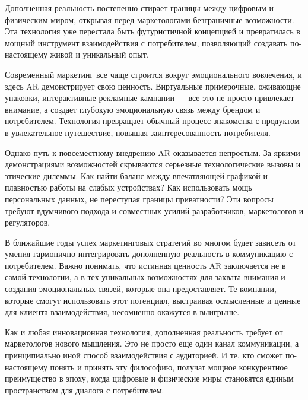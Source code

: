 \documentclass[referat]{SCWorks}
\begin{document}
\conclusion


Дополненная реальность постепенно стирает границы между цифровым и физическим миром, открывая перед маркетологами безграничные возможности. Эта технология уже перестала быть футуристичной концепцией и превратилась в мощный инструмент взаимодействия с потребителем, позволяющий создавать по-настоящему живой и уникальный опыт.

Современный маркетинг все чаще строится вокруг эмоционального вовлечения, и здесь AR демонстрирует свою ценность. Виртуальные примерочные, оживающие упаковки, интерактивные рекламные кампании --- все это не просто привлекает внимание, а создает глубокую эмоциональную связь между брендом и потребителем. Технология превращает обычный процесс знакомства с продуктом в увлекательное путешествие, повышая заинтересованность потребителя.

Однако путь к повсеместному внедрению AR оказывается непростым. За яркими демонстрациями возможностей скрываются серьезные технологические вызовы и этические дилеммы. Как найти баланс между впечатляющей графикой и плавностью работы на слабых устройствах? Как использовать мощь персональных данных, не переступая границы приватности? Эти вопросы требуют вдумчивого подхода и совместных усилий разработчиков, маркетологов и регуляторов.

В ближайшие годы успех маркетинговых стратегий во многом будет зависеть от умения гармонично интегрировать дополненную реальность в коммуникацию с потребителем. Важно понимать, что истинная ценность AR заключается не в самой технологии, а в тех уникальных возможностях для захвата внимания и создания эмоциональных связей, которые она предоставляет. Те компании, которые смогут использовать этот потенциал, выстраивая осмысленные и ценные для клиента взаимодействия, несомненно окажутся в выигрыше.

Как и любая инновационная технология, дополненная реальность требует от маркетологов нового мышления. Это не просто еще один канал коммуникации, а принципиально иной способ взаимодействия с аудиторией. И те, кто сможет по-настоящему понять и принять эту философию, получат мощное конкурентное преимущество в эпоху, когда цифровые и физические миры становятся единым пространством для диалога с потребителем.

\nocite{*}





\appendix
\end{document}
